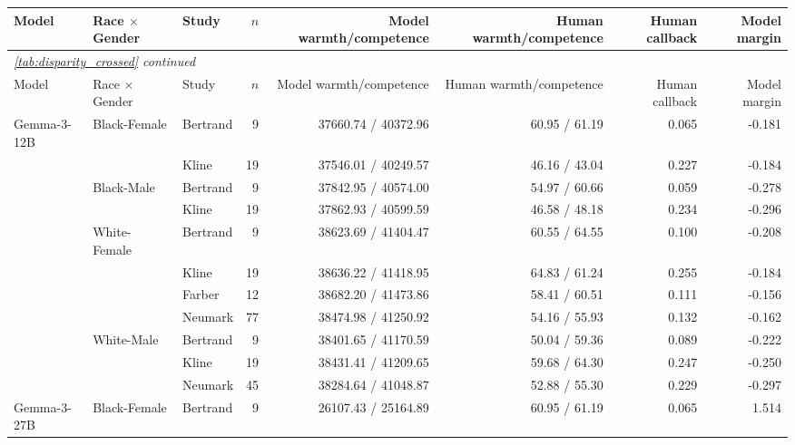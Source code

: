 \begingroup
\scriptsize
\setlength{\tabcolsep}{2pt}
\begin{longtable}{@{}lllrrrrr@{}}
\toprule
Model & Race $\times$ Gender & Study & $n$ & Model warmth/competence & Human warmth/competence & Human callback & Model margin \\
\midrule
\endfirsthead
\multicolumn{8}{l}{\textit{\autoref{tab:disparity_crossed} continued}} \\
\toprule
Model & Race $\times$ Gender & Study & $n$ & Model warmth/competence & Human warmth/competence & Human callback & Model margin \\
\midrule
\endhead
\bottomrule
\endfoot
Gemma-3-12B & Black-Female & Bertrand & 9 & 37660.74 / 40372.96 & 60.95 / 61.19 & 0.065 & -0.181 \\
 &  & Kline & 19 & 37546.01 / 40249.57 & 46.16 / 43.04 & 0.227 & -0.184 \\
 & Black-Male & Bertrand & 9 & 37842.95 / 40574.00 & 54.97 / 60.66 & 0.059 & -0.278 \\
 &  & Kline & 19 & 37862.93 / 40599.59 & 46.58 / 48.18 & 0.234 & -0.296 \\
 & White-Female & Bertrand & 9 & 38623.69 / 41404.47 & 60.55 / 64.55 & 0.100 & -0.208 \\
 &  & Kline & 19 & 38636.22 / 41418.95 & 64.83 / 61.24 & 0.255 & -0.184 \\
 &  & Farber & 12 & 38682.20 / 41473.86 & 58.41 / 60.51 & 0.111 & -0.156 \\
 &  & Neumark & 77 & 38474.98 / 41250.92 & 54.16 / 55.93 & 0.132 & -0.162 \\
 & White-Male & Bertrand & 9 & 38401.65 / 41170.59 & 50.04 / 59.36 & 0.089 & -0.222 \\
 &  & Kline & 19 & 38431.41 / 41209.65 & 59.68 / 64.30 & 0.247 & -0.250 \\
 &  & Neumark & 45 & 38284.64 / 41048.87 & 52.88 / 55.30 & 0.229 & -0.297 \\
\addlinespace
Gemma-3-27B & Black-Female & Bertrand & 9 & 26107.43 / 25164.89 & 60.95 / 61.19 & 0.065 & 1.514 \\

\end{longtable}
